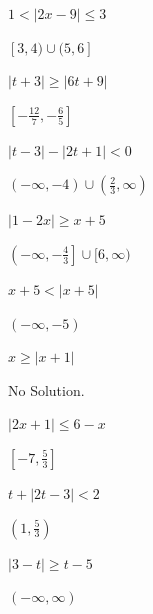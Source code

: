 \documentclass{ximera}
\begin{document}
\begin{question}
\begin{problem}
$1 < |2x - 9| \leq 3$

\begin{solution}
$[3, 4) \cup (5, 6]$
\end{solution}
\end{problem}

\begin{problem}
$|t + 3| \geq |6t + 9|$

\begin{solution}
$\left[-\frac{12}{7}, -\frac{6}{5}\right]$
\end{solution}
\end{problem}

\begin{problem}
$|t-3| - |2t+1| < 0$ 

\begin{solution}
$(-\infty, -4) \cup \left( \frac{2}{3}, \infty\right)$
\end{solution}
\end{problem}

\begin{problem}
$|1-2x| \geq x + 5$

\begin{solution}
$\left(-\infty, -\frac{4}{3} \right] \cup [6, \infty)$
\end{solution}
\end{problem}

\begin{problem}
$x + 5 <  |x+5|$

\begin{solution}
$(-\infty, -5)$
\end{solution}
\end{problem}

\begin{problem}
$x \geq |x+1|$ 

\begin{solution}
No Solution.
\end{solution}
\end{problem}

\begin{problem}
$|2x + 1| \leq 6-x$ 

\begin{solution}
$\left[ -7, \frac{5}{3}\right]$
\end{solution}
\end{problem}

\begin{problem}
$t + |2t-3| < 2$

\begin{solution}
$\left( 1, \frac{5}{3} \right)$
\end{solution}
\end{problem}

\begin{problem}\label{solveinequabslast}
$|3-t| \geq t-5$

\begin{solution}
$(-\infty, \infty)$
\end{solution}
\end{problem}
\end{question}
\end{document}
